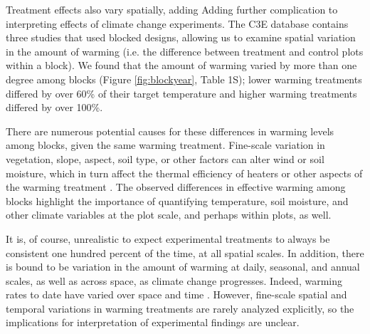 \documentclass{article}
\begin{document}
\par Treatment effects also vary spatially, adding Adding further complication to interpreting effects of climate change experiments. The C3E database contains three studies that used blocked designs, allowing us to examine spatial variation in the amount of warming (i.e. the difference between treatment and control plots within a block). We found that the amount of warming varied by more than one degree among blocks (Figure \ref{fig:blockyear}, Table 1S); lower warming treatments differed by over 60\% of their target temperature and higher warming treatments differed by over 100\%.
\par There are numerous potential causes for these differences in warming levels among blocks, given the same warming treatment. Fine-scale variation in vegetation, slope, aspect, soil type, or other factors can alter wind or soil moisture, which in turn affect the thermal efficiency of heaters or other aspects of the warming treatment \citep{peterjohn1993,kimball2005,kimball2008,hoeppner2012,rollinson2015}. The observed differences in effective warming among blocks highlight the importance of quantifying temperature, soil moisture, and other climate variables at the plot scale, and perhaps within plots, as well. 

\par It is, of course, unrealistic to expect experimental treatments to always be consistent one hundred percent of the time, at all spatial scales. In addition, there is bound to be variation in the amount of warming at daily, seasonal, and annual scales, as well as across space, as climate change progresses. Indeed, warming rates to date have varied over space and time \citep{ipcc2013}. However, fine-scale spatial and temporal variations in warming treatments are rarely analyzed explicitly, so the implications for interpretation of experimental findings are unclear. %
\end{document}

